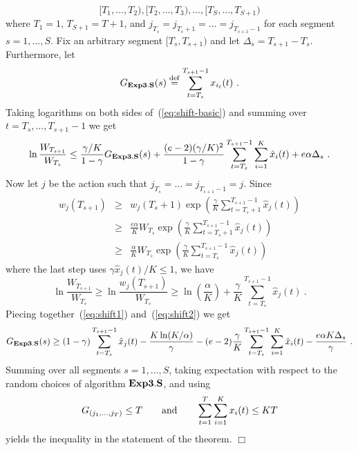 \documentclass[12pt]{article}
\newcommand{\Aests}{{\bf Exp3.S}}
\newcommand{\expb}[1]{\exp\left(#1\right)}
\newcommand{\defeq}{\stackrel{\rm def}{=}}
\newcommand{\x}[2]{x_{#1}({#2})}
\newcommand{\w}[2]{w_{#1}({#2})}
\newcommand{\G}[2]{G_{#1}({#2})}
\newcommand{\hx}[2]{\hat{x}_{#1}(#2)}
\begin{document}
\[
        [T_1,\ldots,T_2),[T_2,\ldots,T_3),\ldots,[T_S,\ldots,T_{S+1})
\]
where $T_1=1$, $T_{S+1}=T+1$, and $j_{T_s}=j_{T_s+1}=\ldots=j_{T_{s+1}-1}$
for each segment $s=1,\ldots,S$. Fix an arbitrary segment $[T_s,T_{s+1})$
and let $\Delta_s=T_{s+1}-T_s$.
Furthermore, let
\[
\G{\Aests}{s} \defeq \sum_{t=T_s}^{T_{s+1}-1} \x{i_t}{t}~.
\]
Taking logarithms on both sides of~(\ref{eq:shift-basic}) and summing over
$t=T_s,\ldots,T_{s+1}-1$ we get
\begin{equation}
\label{eq:shift1}
        \ln\frac{W_{T_{s+1}}}{W_{T_s}}
        \leq \frac{\gamma/K}{1-\gamma} \G{\Aests}{s}
        + \frac{(e-2)(\gamma/K)^2}{1-\gamma}
        \sum_{t=T_s}^{T_{s+1}-1}\sum_{i=1}^K \hx{i}{t}
        + e\alpha\Delta_s~.
\end{equation}
Now let $j$ be the action such that $j_{T_s}=\ldots=j_{T_{s+1}-1}=j$.
Since
\begin{eqnarray*}
        \w{j}{T_{s+1}}
& \geq &
        \w{j}{T_s+1} \expb{\frac{\gamma}{K}\sum_{t=T_s+1}^{T_{s+1}-1}\hx{j}{t}}
\\ & \geq &
        \frac{e\alpha}{K}W_{T_s}
        \expb{\frac{\gamma}{K}\sum_{t=T_s+1}^{T_{s+1}-1}\hx{j}{t}}
\\ & \geq &
        \frac{\alpha}{K}W_{T_s}
        \expb{\frac{\gamma}{K}\sum_{t=T_s}^{T_{s+1}-1}\hx{j}{t}}
\end{eqnarray*}
where the last step uses $\gamma\hx{j}{t}/K \leq 1$, we have
\begin{equation}
\label{eq:shift2}
        \ln\frac{W_{T_{s+1}}}{W_{T_s}} \geq \ln\frac{\w{j}{T_{s+1}}}{W_{T_s}}
        \geq \ln\left(\frac{\alpha}{K}\right)
        + \frac{\gamma}{K}\sum_{t=T_s}^{T_{s+1}-1} \hx{j}{t}~.
\end{equation}
Piecing together~(\ref{eq:shift1}) and~(\ref{eq:shift2}) we get
\[
    \G{\Aests}{s}
\geq
    (1-\gamma)\sum_{t=T_s}^{T_{s+1}-1} \hx{j}{t} - \frac{K\ln(K/\alpha)}{\gamma}
    - (e-2)\frac{\gamma}{K}\sum_{t=T_s}^{T_{s+1}-1}\sum_{i=1}^K \hx{i}{t}
        - \frac{e\alpha K\Delta_s}{\gamma}~.
\]
Summing over all segments $s=1,\ldots,S$, taking expectation with respect to the
random choices of algorithm $\Aests$, and using
\[
        G_{(j_1,\ldots,j_T)} \leq T
\qquad\mbox{\rm and}\qquad
        \sum_{t=1}^T\sum_{i=1}^K \x{i}{t} \leq KT
\]
yields the inequality in the statement of the theorem.
\hfill $\Box$
\end{document}

